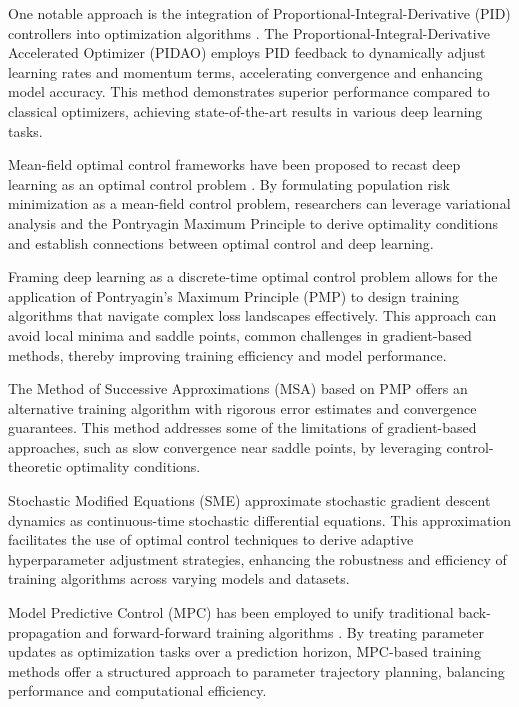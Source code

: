\documentclass{article}
\theoremstyle{plain}
\theoremstyle{definition}
\theoremstyle{remark}
\begin{document}
One notable approach is the integration of Proportional-Integral-Derivative (PID) controllers into optimization algorithms \cite{chenAcceleratedOptimizationDeep2024}. The Proportional-Integral-Derivative Accelerated Optimizer (PIDAO) employs PID feedback to dynamically adjust learning rates and momentum terms, accelerating convergence and enhancing model accuracy. This method demonstrates superior performance compared to classical optimizers, achieving state-of-the-art results in various deep learning tasks.

Mean-field optimal control frameworks have been proposed to recast deep learning as an optimal control problem \cite{eMeanfieldOptimalControl2018}. By formulating population risk minimization as a mean-field control problem, researchers can leverage variational analysis and the Pontryagin Maximum Principle to derive optimality conditions and establish connections between optimal control and deep learning.

Framing deep learning as a discrete-time optimal control problem \cite{liOptimalControlApproach2018} allows for the application of Pontryagin’s Maximum Principle (PMP) to design training algorithms that navigate complex loss landscapes effectively. This approach can avoid local minima and saddle points, common challenges in gradient-based methods, thereby improving training efficiency and model performance.

The Method of Successive Approximations (MSA) based on PMP \cite{liMaximumPrincipleBased2018} offers an alternative training algorithm with rigorous error estimates and convergence guarantees. This method addresses some of the limitations of gradient-based approaches, such as slow convergence near saddle points, by leveraging control-theoretic optimality conditions.

Stochastic Modified Equations (SME) \cite{liStochasticModifiedEquations2017} approximate stochastic gradient descent dynamics as continuous-time stochastic differential equations. This approximation facilitates the use of optimal control techniques to derive adaptive hyperparameter adjustment strategies, enhancing the robustness and efficiency of training algorithms across varying models and datasets.

Model Predictive Control (MPC) has been employed to unify traditional back-propagation and forward-forward training algorithms \cite{renUnifyingBackpropagationForwardforward2024}. By treating parameter updates as optimization tasks over a prediction horizon, MPC-based training methods offer a structured approach to parameter trajectory planning, balancing performance and computational efficiency.
\end{document}
